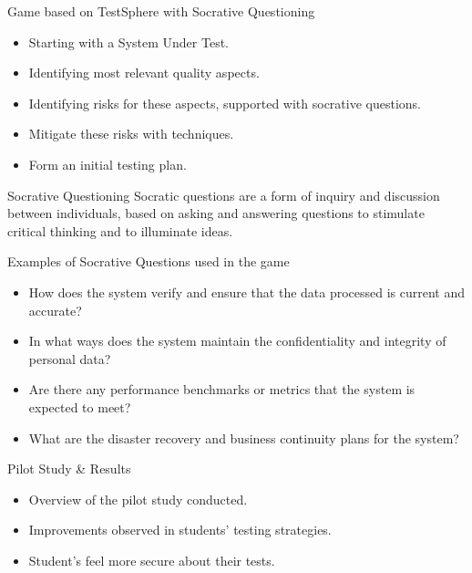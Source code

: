 \documentclass[aspectratio=169]{beamer}
\begin{document}
\begin{frame}{Game based on TestSphere with Socrative Questioning}
    \begin{itemize}
        \item Starting with a System Under Test.
        \item Identifying most relevant quality aspects.
        \item Identifying risks for these aspects, supported with socrative questions.
        \item Mitigate these risks with techniques.
        \item Form an initial testing plan.
    \end{itemize}
\end{frame}

\begin{frame}{Socrative Questioning}
    Socratic questions are a form of inquiry and discussion between individuals, based on asking and answering questions to stimulate critical thinking and to illuminate ideas.
\end{frame}

\begin{frame}{Examples of Socrative Questions used in the game}
    \begin{itemize}
        \item How does the system verify and ensure that the data processed is current and accurate?
        \item In what ways does the system maintain the confidentiality and integrity of personal data?
        \item Are there any performance benchmarks or metrics that the system is expected to meet?
        \item What are the disaster recovery and business continuity plans for the system?
    \end{itemize}
\end{frame}

\begin{frame}{Pilot Study \& Results}
    \begin{itemize}
        \item Overview of the pilot study conducted.
        \item Improvements observed in students' testing strategies.
        \item Student's feel more secure about their tests.
    \end{itemize}
\end{frame}
\end{document}
